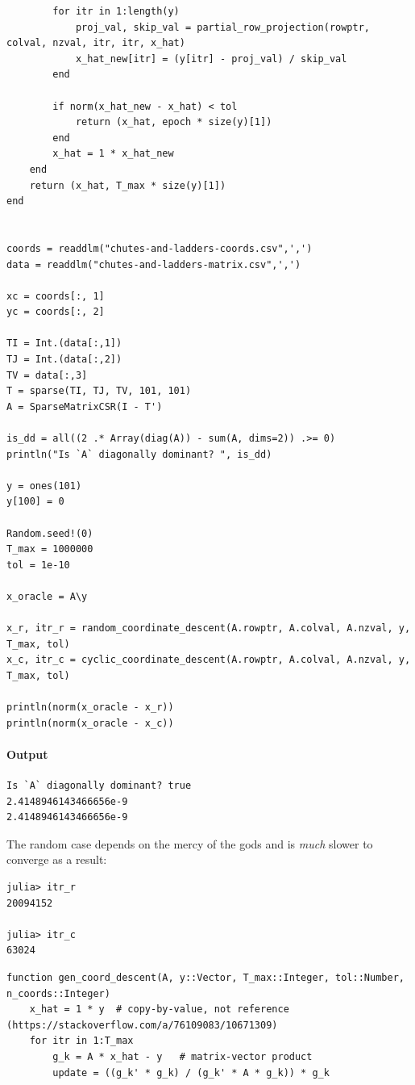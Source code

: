 \documentclass[]{exam}
\let\oldparagraph\paragraph
\renewcommand{\paragraph}[1]{\oldparagraph{#1}\mbox{}}
\begin{document}
\begin{questions}
\begin{lstlisting}
		for itr in 1:length(y)
			proj_val, skip_val = partial_row_projection(rowptr, colval, nzval, itr, itr, x_hat)
			x_hat_new[itr] = (y[itr] - proj_val) / skip_val
		end

		if norm(x_hat_new - x_hat) < tol
			return (x_hat, epoch * size(y)[1])
		end
		x_hat = 1 * x_hat_new
	end
	return (x_hat, T_max * size(y)[1])
end


coords = readdlm("chutes-and-ladders-coords.csv",',')
data = readdlm("chutes-and-ladders-matrix.csv",',')

xc = coords[:, 1]
yc = coords[:, 2]

TI = Int.(data[:,1])
TJ = Int.(data[:,2])
TV = data[:,3]
T = sparse(TI, TJ, TV, 101, 101)
A = SparseMatrixCSR(I - T')

is_dd = all((2 .* Array(diag(A)) - sum(A, dims=2)) .>= 0)
println("Is `A` diagonally dominant? ", is_dd)

y = ones(101)
y[100] = 0

Random.seed!(0)
T_max = 1000000
tol = 1e-10

x_oracle = A\y

x_r, itr_r = random_coordinate_descent(A.rowptr, A.colval, A.nzval, y, T_max, tol)
x_c, itr_c = cyclic_coordinate_descent(A.rowptr, A.colval, A.nzval, y, T_max, tol)

println(norm(x_oracle - x_r))
println(norm(x_oracle - x_c))
\end{lstlisting}

\paragraph{Output}

\begin{lstlisting}
Is `A` diagonally dominant? true
2.4148946143466656e-9
2.4148946143466656e-9
\end{lstlisting}

The random case depends on the mercy of the gods and is {\it much} slower to converge as a result:
\begin{lstlisting}
julia> itr_r
20094152

julia> itr_c
63024
\end{lstlisting}

\newpage
\question
\hfill

\begin{lstlisting}
function gen_coord_descent(A, y::Vector, T_max::Integer, tol::Number, n_coords::Integer)
	x_hat = 1 * y  # copy-by-value, not reference (https://stackoverflow.com/a/76109083/10671309)
	for itr in 1:T_max
		g_k = A * x_hat - y   # matrix-vector product
		update = ((g_k' * g_k) / (g_k' * A * g_k)) * g_k


\end{lstlisting}
\end{questions}
\end{document}

